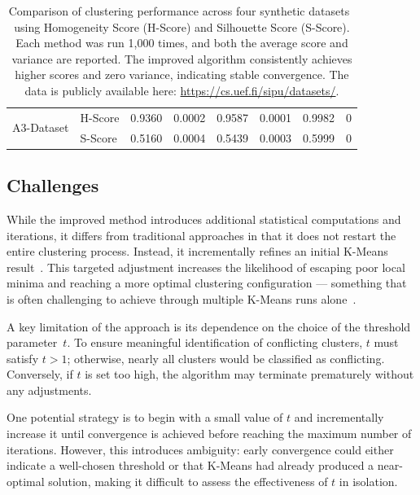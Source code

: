\documentclass[10pt,twocolumn,letterpaper]{article}
\begin{document}
\begin{table}
\begin{tabular}{ll c c c c c c}
        \multirow{2}{*}{A3-Dataset} & H-Score & 0.9360                      & 0.0002                        & 0.9587                       & 0.0001   & 0.9982 & 0        \\
                                    & S-Score & 0.5160                      & 0.0004                        & 0.5439                       & 0.0003   & 0.5999 & 0        \\
        \bottomrule
    \end{tabular}
    \vspace{5pt}
    \caption{
        Comparison of clustering performance across four synthetic datasets~\cite{ClusteringDatasets} using Homogeneity Score (H-Score) and Silhouette Score (S-Score). Each method was run 1,000 times, and both the average score and variance are reported. The improved algorithm consistently achieves higher scores and zero variance, indicating stable convergence. The data is publicly available here: \href{https://cs.uef.fi/sipu/datasets/}{https://cs.uef.fi/sipu/datasets/}.
    }
    \label{tab:clustering_comparison}
\end{table}


\subsection{Challenges}\label{subsec:challenges}

While the improved method introduces additional statistical computations and
iterations, it differs from traditional approaches in that it does not restart
the entire clustering process. Instead, it incrementally refines an initial
K-Means result~\cite{Abdullah10601123}. This targeted adjustment increases the
likelihood of escaping poor local minima and reaching a more optimal clustering
configuration — something that is often challenging to achieve through multiple
K-Means runs alone~\cite{FRANTI201995}.

A key limitation of the approach is its dependence on the choice of the
threshold parameter~$t$. To ensure meaningful identification of conflicting
clusters, $t$ must satisfy $t > 1$; otherwise, nearly all clusters would be
classified as conflicting. Conversely, if $t$ is set too high, the algorithm
may terminate prematurely without any adjustments.

One potential strategy is to begin with a small value of $t$ and incrementally
increase it until convergence is achieved before reaching the maximum number of
iterations. However, this introduces ambiguity: early convergence could either
indicate a well-chosen threshold or that K-Means had already produced a
near-optimal solution, making it difficult to assess the effectiveness of $t$
in isolation.
\end{document}
